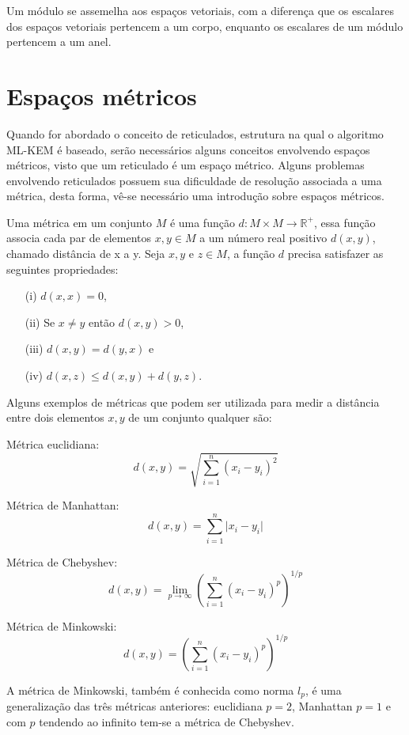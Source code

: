     Um módulo se assemelha aos espaços vetoriais, com a diferença que os escalares dos espaços vetoriais pertencem a um corpo, enquanto os escalares de um módulo pertencem a um anel.

\pagebreak
\section{Espaços métricos}
\label{sec:espacos_metricos}
    Quando for abordado o conceito de reticulados, estrutura na qual o algoritmo \ac{ML-KEM} é baseado, serão necessários alguns conceitos envolvendo espaços métricos, visto que um reticulado é um espaço métrico. Alguns problemas envolvendo reticulados possuem sua dificuldade de resolução associada a uma métrica, desta forma, vê-se necessário uma introdução sobre espaços métricos.

    Uma métrica em um conjunto $M$ é uma função $d:M \times M \rightarrow \mathbb{R}^{+}$, essa função associa cada par de elementos $x,y \in M$ a um número real positivo $d(x,y)$, chamado distância de x a y. Seja $x,y$ e $z \in M$, a função $d$ precisa satisfazer as seguintes propriedades:

    \begin{enumerate}
        \item[(i)] $d(x,x) = 0$,
        \item[(ii)] Se $x \neq y$ então $d(x,y) > 0$,
        \item[(iii)] $d(x,y) = d(y,x)$ e
        \item[(iv)] $d(x,z) \leq d(x,y) + d(y,z)$.
    \end{enumerate}

    Alguns exemplos de métricas que podem ser utilizada para medir a distância entre dois elementos $x,y$ de um conjunto qualquer são:

    \noindent
    Métrica euclidiana:
    $$d(x,y) = \sqrt{\sum_{i=1}^{n} (x_i - y_i)^2}$$

    \noindent
    Métrica de Manhattan:
    $$d(x,y) = \sum_{i=1}^{n} \vert x_i - y_i \vert$$

    \noindent
    Métrica de Chebyshev:
    $$d(x,y) = \lim_{p \to \infty} \left( \sum_{i=1}^{n} (x_i - y_i)^p \right)^{1/p} $$

    \noindent
    Métrica de Minkowski:
    $$d(x,y) = \left( \sum_{i=1}^{n} (x_i - y_i)^p \right)^{1/p} $$
    
    A métrica de Minkowski, também é conhecida como norma $l_p$, é uma generalização das três métricas anteriores: euclidiana $p = 2$, Manhattan $p = 1$ e com $p$ tendendo ao infinito tem-se a métrica de Chebyshev. 

